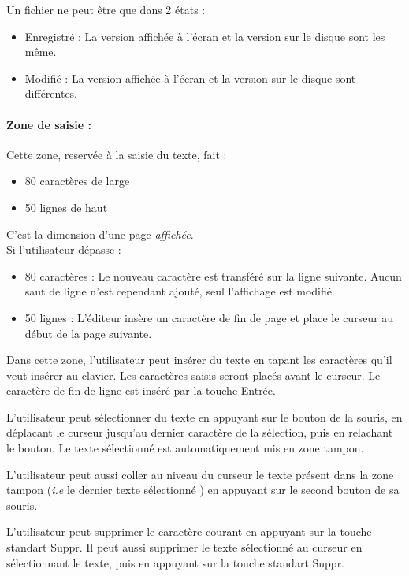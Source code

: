 Un fichier ne peut être que dans 2 états :
\begin{itemize}
	\item Enregistré : La version affichée à l'écran et la version sur le disque sont les même.
	\item Modifié :	La version affichée à l'écran et la version sur le disque sont différentes.
\end{itemize}

\paragraph{Zone de saisie :} Cette zone, reservée à la saisie du texte, fait :
\begin{itemize}
	\item 80 caractères de large
	\item 50 lignes de haut
\end{itemize}
C'est la dimension d'une page \emph{affichée}.\\

Si l'utilisateur dépasse :
\begin{itemize}
	\item 80 caractères : Le nouveau caractère est transféré sur la ligne suivante. Aucun saut de ligne n'est cependant ajouté, seul l'affichage est modifié.
	\item 50 lignes : L'éditeur insère un caractère de fin de page et place le curseur au début de la page suivante.\\
\end{itemize}

Dans cette zone, l'utilisateur peut insérer du texte en tapant les caractères qu'il veut insérer au clavier. Les caractères saisis seront placés avant le curseur. Le caractère de fin de ligne est inséré par la touche \og Entrée\fg.

L'utilisateur peut sélectionner du texte en appuyant sur le bouton de la souris, en déplacant le curseur jusqu'au dernier caractère de la sélection, puis en relachant le bouton. Le texte sélectionné est automatiquement mis en zone tampon.

L'utilisateur peut aussi coller au niveau du curseur le texte présent dans la zone tampon (\textsl{i.e} le dernier texte sélectionné ) en appuyant sur le second bouton de sa souris.

L'utilisateur peut supprimer le caractère courant en appuyant sur la touche standart \og Suppr\fg. Il peut aussi supprimer le texte sélectionné au curseur en sélectionnant le texte, puis en appuyant sur la touche standart \og Suppr\fg.

